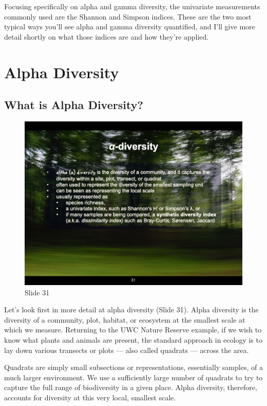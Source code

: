 \documentclass[
  10pt,
]{book}
\begin{document}
Focusing specifically on alpha and gamma diversity, the univariate
measurements commonly used are the Shannon and Simpson indices. These
are the two most typical ways you'll see alpha and gamma diversity
quantified, and I'll give more detail shortly on what those indices are
and how they're applied.

\section{Alpha Diversity}\label{alpha-diversity}

\subsection{What is Alpha Diversity?}\label{what-is-alpha-diversity}

\begin{figure}[ht]
\centering
\includegraphics[width=0.8\linewidth]{../images/BDC334/BDC334-031.jpeg}
\caption*{Slide 31}
\end{figure}

Let's look first in more detail at alpha diversity (Slide 31). Alpha
diversity is the diversity of a community, plot, habitat, or ecosystem
at the smallest scale at which we measure. Returning to the UWC Nature
Reserve example, if we wish to know what plants and animals are present,
the standard approach in ecology is to lay down various transects or
plots --- also called quadrats --- across the area.

Quadrats are simply small subsections or representations, essentially
samples, of a much larger environment. We use a sufficiently large
number of quadrats to try to capture the full range of biodiversity in a
given place. Alpha diversity, therefore, accounts for diversity at this
very local, smallest scale.
\end{document}
